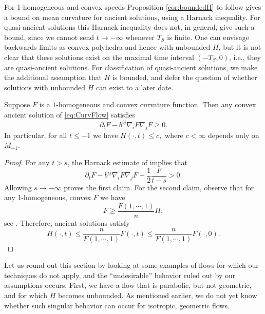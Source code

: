 \documentclass{amsart}
\begin{document}
For 1-homogeneous and convex speeds Proposition \ref{cor:boundedH} to follow gives a bound on mean curvature for ancient solutions, using a Harnack inequality. For quasi-ancient solutions this Harnack inequality does not, in general, give such a bound, since we cannot send \(t \to -\infty\) whenever \(T_S\) is finite. One can envisage backwards limits as convex polyhedra and hence with unbounded \(H\), but it is not clear that these solutions exist on the maximal time interval \((-T_S, 0)\), i.e., they are quasi-ancient solutions. For classification of quasi-ancient solutions, we make the additional assumption that \(H\) is bounded, and defer the question of whether solutions with unbounded \(H\) can exist to a later date.

\begin{prop}
\label{cor:boundedH}
Suppose $F$ is a \(1\)-homogeneous and convex curvature function. Then any convex ancient solution of \eqref{eq:CurvFlow} satisfies
\[\partial_t F-b^{ij}\nabla_i F \nabla_j F \geq 0.\]
In particular, for all $t\le -1$ we have
$H(\cdot,t)\leq c,$
where $c<\infty$ depends only on $M_{-1}.$
\end{prop}
\begin{proof}
For any $t>s$, the  Harnack estimate of \cite[Theorem 1]{bryan2015harnack} implies that
$$\partial_t F-b^{ij}\nabla_i F\nabla_j F+\frac{1}{2}\frac{F}{t-s}>0.$$
Allowing $s\to-\infty$ proves the first claim. For the second claim, observe that for any 1-homogeneous, convex $F$ we have \[F\ge \frac{F(1,\cdots,1)}{n}H,\]
see \cite[Lemma~2.2.20]{Gerhardt:/2006}. Therefore, ancient solutions satisfy
\[H(\cdot,t)\leq \frac{n}{F(1,\cdots,1)}F(\cdot,t)\leq \frac{n}{F(1,\cdots,1)}F(\cdot,0). \]
\end{proof}
Let us round out this section by looking at some examples of flows for which our techniques do not apply, and the ``undesirable'' behavior ruled out by our assumptions occurs. First, we have a flow that is parabolic, but not geometric, and for which \(H\) becomes unbounded. As mentioned earlier, we do not yet know whether such singular behavior can occur for isotropic, geometric flows.
\end{document}
